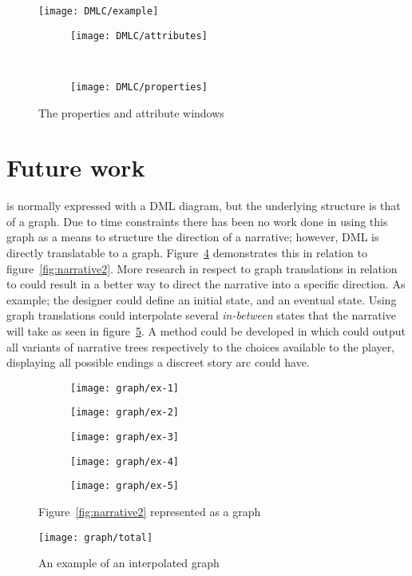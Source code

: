 \begin{figure}
	\texttt{[image: DMLC/example]}
\end{figure}
\begin{figure}
\centering
\begin{subfigure}{0.4\textwidth}
	\texttt{[image: DMLC/attributes]}
\label{fig:DMLC:screens:attributes}
\end{subfigure}
~
\begin{subfigure}{0.4\textwidth}
	\texttt{[image: DMLC/properties]}
\label{fig:DMLC:screens:properties}
\end{subfigure}
	\caption{The properties and attribute windows}\label{fig:DMLC:screens}
\end{figure}


\section{Future work}
\diage is normally expressed with a DML diagram, but the underlying structure is that of a graph.
Due to time constraints there has been no work done in using this graph as a means to structure the direction of a narrative; however, DML is directly translatable to a graph.
Figure~\ref{fig:graph:fetch} demonstrates this in relation to figure~\ref{fig:narrative2}.
More research in respect to graph translations in relation to \diage could result in a better way to direct the narrative into a specific direction.
As example; the designer could define an initial state, and an eventual state.
Using graph translations \diage could interpolate several \textit{in-between} states that the narrative will take as seen in figure~\ref{fig:graph}.
A method could be developed in which \diage could output all variants of narrative trees respectively to the choices available to the player, displaying all possible endings a discreet story arc could have.

\begin{figure}
\centering
	\begin{subfigure}{0.4\textwidth}
		\texttt{[image: graph/ex-1]}
	\end{subfigure}
	\begin{subfigure}{0.4\textwidth}
		\texttt{[image: graph/ex-2]}
	\end{subfigure}
	\begin{subfigure}{0.4\textwidth}
		\texttt{[image: graph/ex-3]}
	\end{subfigure}
	\begin{subfigure}{0.4\textwidth}
		\texttt{[image: graph/ex-4]}
	\end{subfigure}
	\begin{subfigure}{0.4\textwidth}
		\texttt{[image: graph/ex-5]}
	\end{subfigure}
	\caption{Figure~\ref{fig:narrative2} represented as a graph}\label{fig:graph:fetch}
\end{figure}

\begin{figure}
	\texttt{[image: graph/total]}
	\caption{An example of an interpolated graph} \label{fig:graph}
\end{figure}
